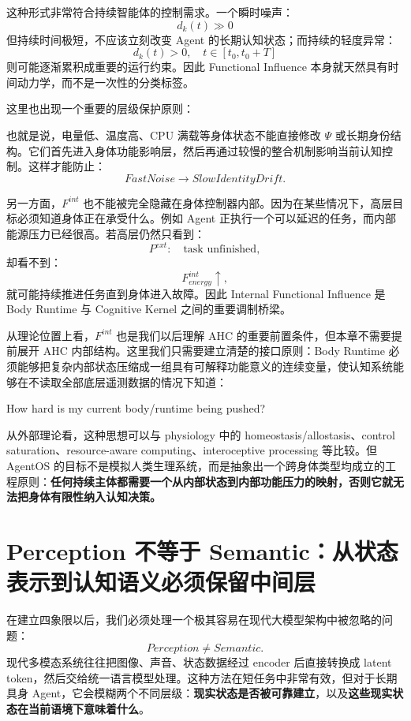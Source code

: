 这种形式非常符合持续智能体的控制需求。一个瞬时噪声：
\[
d_k(t)\gg0
\]
但持续时间极短，不应该立刻改变 Agent 的长期认知状态；而持续的轻度异常：
\[
d_k(t)>0,\quad t\in[t_0,t_0+T]
\]
则可能逐渐累积成重要的运行约束。因此 Functional Influence 本身就天然具有时间动力学，而不是一次性的分类标签。

这里也出现一个重要的层级保护原则：
\begin{statementbox}
\centering
{}
\end{statementbox}
也就是说，电量低、温度高、CPU 满载等身体状态不能直接修改 $\Psi$ 或长期身份结构。它们首先进入身体功能影响层，然后再通过较慢的整合机制影响当前认知控制。这样才能防止：
\[
FastNoise
\rightarrow
SlowIdentityDrift.
\]

另一方面，$F^{int}$ 也不能被完全隐藏在身体控制器内部。因为在某些情况下，高层目标必须知道身体正在承受什么。例如 Agent 正执行一个可以延迟的任务，而内部能源压力已经很高。若高层仍然只看到：
\[
P^{ext}:
\quad
\text{task unfinished},
\]
却看不到：
\[
F^{int}_{energy}\uparrow,
\]
就可能持续推进任务直到身体进入故障。因此 Internal Functional Influence 是 Body Runtime 与 Cognitive Kernel 之间的重要调制桥梁。

从理论位置上看，$F^{int}$ 也是我们以后理解 AHC 的重要前置条件，但本章不需要提前展开 AHC 内部结构。这里我们只需要建立清楚的接口原则：Body Runtime 必须能够把复杂内部状态压缩成一组具有可解释功能意义的连续变量，使认知系统能够在不读取全部底层遥测数据的情况下知道：
\begin{proposition*}
How hard is my current body/runtime being pushed?
\end{proposition*}

从外部理论看，这种思想可以与 physiology 中的 homeostasis/allostasis、control saturation、resource-aware computing、interoceptive processing 等比较。但 AgentOS 的目标不是模拟人类生理系统，而是抽象出一个跨身体类型均成立的工程原则：\textbf{任何持续主体都需要一个从内部状态到内部功能压力的映射，否则它就无法把身体有限性纳入认知决策。}

\section{Perception 不等于 Semantic：从状态表示到认知语义必须保留中间层}
\label{sec:perception-not-semantic}

在建立四象限以后，我们必须处理一个极其容易在现代大模型架构中被忽略的问题：
\[
\boxed{
Perception\neq Semantic.
}
\]
现代多模态系统往往把图像、声音、状态数据经过 encoder 后直接转换成 latent token，然后交给统一语言模型处理。这种方法在短任务中非常有效，但对于长期具身 Agent，它会模糊两个不同层级：\textbf{现实状态是否被可靠建立}，以及\textbf{这些现实状态在当前语境下意味着什么}。

